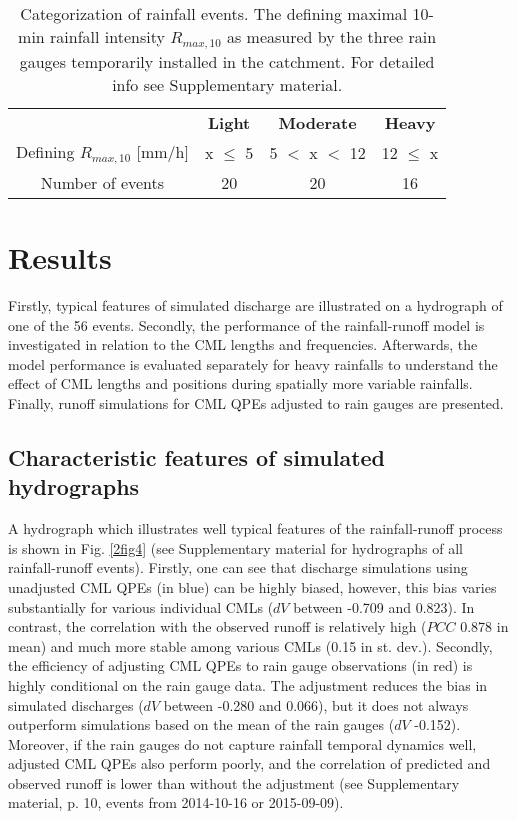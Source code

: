 \documentclass{ctuthesis}\usepackage[]{graphicx}\usepackage[]{color}
\begin{document}
\begin{table}[h]
\begin{ctucolortab}
\centering
\begin{tabular}{ c | c  c  c  }
	    &       \textbf{Light}   &  \bfseries Moderate  &  \bfseries  Heavy    \\ \Midrule
        Defining $R_{max,10}$ [mm/h]  &  x $\leq$ 5  & 5 $<$ x $<$ 12 &  12 $\leq$ x     \\
            Number of events  &  20  & 20 &  16
\end{tabular}
\caption{Categorization of rainfall events. The defining maximal 10-min rainfall intensity $R_{max,10}$ as measured by the three rain gauges temporarily installed in the catchment. For detailed info see Supplementary material.}
\label{2tab2}
\end{ctucolortab}
\end{table}


\section{Results}

Firstly, typical features of simulated discharge are illustrated on a hydrograph of one of the 56 events. Secondly, the performance of the rainfall-runoff model is investigated in relation to the CML lengths and frequencies. Afterwards, the model performance is evaluated separately for heavy rainfalls to understand the effect of CML lengths and positions during spatially more variable rainfalls. Finally, runoff simulations for CML QPEs adjusted to rain gauges are presented.

\subsection{Characteristic features of simulated hydrographs}

A hydrograph which illustrates well typical features of the rainfall-runoff process is shown in Fig. \ref{2fig4} (see Supplementary material for hydrographs of all rainfall-runoff events). Firstly, one can see that discharge simulations using unadjusted CML QPEs (in blue) can be highly biased, however, this bias varies substantially for various individual CMLs ($dV$ between -0.709 and 0.823). In contrast, the correlation with the observed runoff is relatively high ($PCC$ 0.878 in mean) and much more stable among various CMLs (0.15 in st. dev.). Secondly, the efficiency of adjusting CML QPEs to rain gauge observations (in red) is highly conditional on the rain gauge data. The adjustment reduces the bias in simulated discharges ($dV$ between -0.280 and 0.066), but it does not always outperform simulations based on the mean of the rain gauges ($dV$ -0.152). Moreover, if the rain gauges do not capture rainfall temporal dynamics well, adjusted CML QPEs also perform poorly, and the correlation of predicted and observed runoff is lower than without the adjustment (see Supplementary material, p. 10, events from 2014-10-16 or 2015-09-09).
\end{document}

